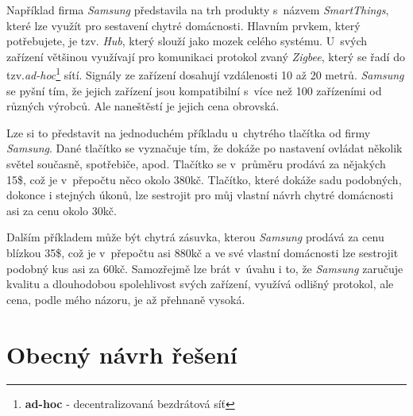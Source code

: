 Například firma \emph{Samsung} představila na trh produkty s~názvem \emph{SmartThings}, které lze využít pro sestavení chytré domácnosti.
Hlavním prvkem, který potřebujete, je tzv. \emph{Hub}, který slouží jako mozek celého systému.
U~svých zařízení většinou využívají pro komunikaci protokol zvaný \emph{Zigbee}, který se řadí do tzv.\emph{ad-hoc}\footnote{\textbf{ad-hoc} - decentralizovaná bezdrátová síť} sítí.
Signály ze zařízení dosahují vzdálenosti 10 až 20 metrů.
\emph{Samsung} se pyšní tím, že jejich zařízení jsou kompatibilní s~více než 100 zařízeními od různých výrobců.
Ale naneštěstí je jejich cena obrovská.

Lze si to představit na jednoduchém příkladu u~chytrého tlačítka od firmy \emph{Samsung}.
Dané tlačítko se vyznačuje tím, že dokáže po nastavení ovládat několik světel současně, spotřebiče, apod.
Tlačítko se v~průměru prodává za nějakých 15\$, což je v~přepočtu něco okolo 380kč.
Tlačítko, které dokáže sadu podobných, dokonce i stejných úkonů, lze sestrojit pro můj vlastní návrh chytré domácnosti asi za cenu okolo 30kč.

Dalším příkladem může být chytrá zásuvka, kterou \emph{Samsung} prodává za cenu blízkou 35\$, což je v~přepočtu asi 880kč a ve své vlastní domácnosti lze sestrojit podobný kus asi za 60kč.
Samozřejmě lze brát v~úvahu i to, že \emph{Samsung} zaručuje kvalitu a dlouhodobou spolehlivost svých zařízení, využívá odlišný protokol, ale cena, podle mého názoru, je až přehnaně vysoká.

\newpage

\section*{Obecný návrh řešení}
\label{navrh:reseni}

